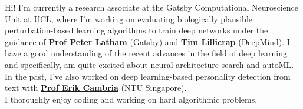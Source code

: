 %
%
%
\par{
Hi! I'm currently a research associate at the Gatsby Computational Neuroscience Unit at UCL, where I’m working on evaluating biologically plausible perturbation-based learning algorithms to train deep networks under the guidance of \href{https://scholar.google.co.uk/citations?user=wmqntyEAAAAJ&hl=en}{\textbf{Prof Peter Latham}} (Gatsby) and \href{https://scholar.google.co.uk/citations?user=htPVdRMAAAAJ&hl=en}{\textbf{Tim Lillicrap}} (DeepMind). I have a good understanding of the recent advances in the field of deep learning and specifically, am quite excited about neural architecture search and autoML. In the past, I’ve also worked on deep learning-based personality detection from text with \href{https://scholar.google.com/citations?user=ilSYpW0AAAAJ&hl=en}{\textbf{Prof Erik Cambria}} (NTU Singapore).
\\
I thoroughly enjoy coding and working on hard algorithmic problems.
}